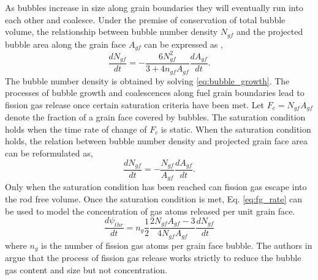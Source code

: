 As bubbles increase in size along grain boundaries they will eventually run into each other and coalesce. Under the premise of conservation of total bubble volume, the relationship between bubble number density $N_{gf}$ and the projected bubble area along the grain face $A_{gf}$ can be expressed as \cite{Pastore3},
\begin{equation}
\label{eq:bubble_coalesecence}
 \frac{dN_{gf}}{dt} = -\frac{6N_{gf}^2}{3+4n_{gf}A_{gf}} \frac{dA_{gf}}{dt}.
\end{equation}
The bubble number density is obtained by solving \ref{eq:bubble_growth}. The processes of bubble growth and coalescences along fuel grain boundaries lead to fission gas release once certain saturation criteria have been met. Let $F_c = N_{gf}A_{gf}$ denote the fraction of a grain face covered by bubbles. The saturation condition holds when the time rate of change of $F_c$ is static. When the saturation condition holds, the relation between bubble number density and projected grain face area can be reformulated as,
\begin{equation}
\label{eq:bubble_coalesecence_sat}
 \frac{dN_{gf}}{dt} = -\frac{N_{gf}}{A_{gf}} \frac{dA_{gf}}{dt}.
\end{equation}
Only when the saturation condition has been reached can fission gas escape into the rod free volume. Once the saturation condition is met, Eq. \ref{eq:fg_rate} can be used to model the concentration of gas atoms released per unit grain face. 
\begin{equation}
\label{eq:fgr_rate}
 \frac{d\psi_{thr}}{dt} = n_g \frac{1}{2} \frac{2N_{gf}A_{gf} - 3}{4N_{gf}A_{gf}} \frac{dN_{gf}}{dt}
\end{equation}      
where $n_g$ is the number of fission gas atoms per grain face bubble. The authors in \cite{Pastore3} argue that the process of fission gas release works strictly to reduce the bubble gas content and size but not concentration. 

